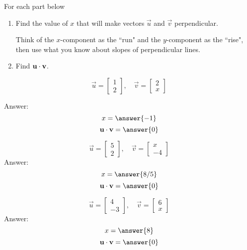 \documentclass{ximera}
\begin{document}
\begin{problem}%
 For each part below
 \begin{enumerate}
 \item 
 Find the value of $x$ that will make vectors $\vec{u}$ and $\vec{v}$ perpendicular. 
  \begin{hint} Think of the $x$-component as the ``run" and the $y$-component as the ``rise", then use what you know about slopes of perpendicular lines.
  \end{hint}
  \item Find $\mathbf{u}\cdot\mathbf{v}$.
  \end{enumerate}
  
 
  \begin{problem}\label{prob:perpvectors2a}
    $$\vec{u} = \begin{bmatrix}1\\2\end{bmatrix},\quad \vec{v}=\begin{bmatrix}2\\x\end{bmatrix}$$
    
    Answer:  
    $$x = \answer{-1}$$
    $$\vec{u}\dotp\vec{v}=\answer{0}$$
  \end{problem}

  \begin{problem}\label{prob:perpvectors2b}
    $$\vec{u} = \begin{bmatrix}5\\2\end{bmatrix},\quad \vec{v}=\begin{bmatrix}x\\-4\end{bmatrix}$$
    Answer:
    $$x = \answer{8/5}$$
    $$\vec{u}\dotp\vec{v}=\answer{0}$$
  \end{problem}

  \begin{problem}\label{prob:perpvectors2c}
    $$\vec{u} = \begin{bmatrix} 4\\-3\end{bmatrix},\quad \vec{v} =\begin{bmatrix}6\\x\end{bmatrix}$$ 
    Answer:
    $$x = \answer{8}$$
    $$\vec{u}\dotp\vec{v}=\answer{0}$$
  \end{problem}
\end{problem}
\end{document}
